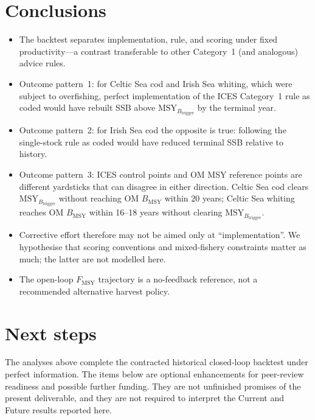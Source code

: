 \documentclass[11pt,a4paper]{article}
\newcommand{\Fmsy}{F_{\mathrm{MSY}}}
\newcommand{\Btrig}{\mathrm{MSY}_{B_{\mathrm{trigger}}}}
\newcommand{\Bmsy}{B_{\mathrm{MSY}}}
\begin{document}
\section{Conclusions}
\label{sec:conclusions}

\begin{itemize}
  \item The backtest separates implementation, rule, and scoring under
        fixed productivity---a contrast transferable to other
        Category~1 (and analogous) advice rules.
  \item Outcome pattern~1: for Celtic Sea cod and Irish Sea whiting,
        which were subject to overfishing, perfect implementation of the
        ICES Category~1 rule as coded would have rebuilt SSB above
        $\Btrig$ by the terminal year.
  \item Outcome pattern~2: for Irish Sea cod the opposite is true:
        following the single-stock rule as coded would have reduced
        terminal SSB relative to history.
  \item Outcome pattern~3: ICES control points and OM MSY reference
        points are different yardsticks that can disagree in either
        direction. Celtic Sea cod clears $\Btrig$ without reaching OM
        $\Bmsy$ within 20 years; Celtic Sea whiting reaches OM $\Bmsy$
        within 16--18 years without clearing $\Btrig$.
  \item Corrective effort therefore may not be aimed only at
        ``implementation''. We hypothesise that scoring conventions and
        mixed-fishery constraints matter as much; the latter are not
        modelled here.
  \item The open-loop $\Fmsy$ trajectory is a no-feedback reference, not
        a recommended alternative harvest policy.
\end{itemize}

\section{Next steps}
\label{sec:next}

The analyses above complete the contracted historical closed-loop
backtest under perfect information. The items below are optional
enhancements for peer-review readiness and possible further funding.
They are not unfinished promises of the present deliverable, and they are
not required to interpret the Current and Future results reported here.
\end{document}
